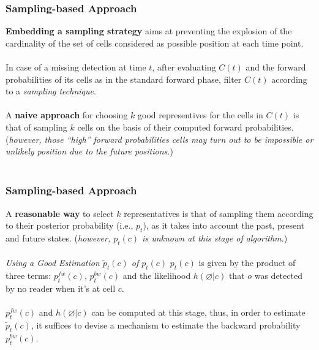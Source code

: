 \begin{frame}
\frametitle{Sampling-based Approach}

\textbf{Embedding a sampling strategy} aims at preventing the explosion of the cardinality of the set of cells considered as possible position at each time point.\\~\\

In case of a missing detection at time $t$, after evaluating $C(t)$ and the forward probabilities of its cells as in the standard forward phase, filter $C(t)$ according to a \emph{sampling technique}.\\~\\

A \textbf{naive approach} for choosing $k$ good representives for the cells in $C(t)$ is that of sampling $k$ cells on the basis of their computed forward probabilities. (\textit{however, those ``high'' forward probabilities cells may turn out to be impossible or unlikely position due to the future positions.})\\~\\

\end{frame}


\begin{frame}
\frametitle{Sampling-based Approach}

A \textbf{reasonable way} to select $k$ representatives is that of sampling them according to their posterior probability (i.e., $p_t$), as it takes into account the past, present and future states. (\textit{however, $p_t(c)$ is unknown at this stage of algorithm.})\\~\\

\emph{Using a Good Estimation $\widetilde{p}_t(c)$ of $p_t(c)$} \quad $p_t(c)$ is given by the product of three terms: $p_t^{fw}(c)$, $p_t^{bw}(c)$ and the likelihood $h(\varnothing|c)$ that $o$ was detected by no reader when it's at cell $c$.\\~\\

$p_t^{fw}(c)$ and $h(\varnothing|c)$ can be computed at this stage, thus, in order to estimate $\widetilde{p}_t(c)$, it suffices to devise a mechanism to estimate the backward probability $p_t^{bw}(c)$.

\end{frame}

